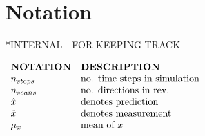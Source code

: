 \section{Notation}
*INTERNAL - FOR KEEPING TRACK

$
\begin{array}{ll}
	\textbf{NOTATION} 	& \textbf{DESCRIPTION}\\
	n_{steps}			& \textnormal{no. time steps in simulation}\\
	n_{scans}			& \textnormal{no. directions in rev.}\\
	\hat{x}	 			& \textnormal{denotes prediction}\\
	\tilde{x}	 		& \textnormal{denotes measurement}\\
	\mu_x		 		& \textnormal{mean of } x\\

\end{array}
$